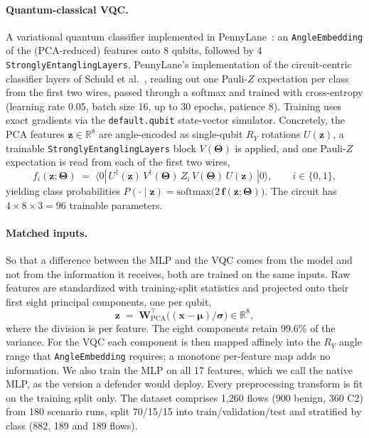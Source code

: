 \documentclass[preprint,12pt]{elsarticle}
\begin{document}
\paragraph{Quantum-classical VQC.} A variational quantum classifier implemented in
PennyLane~\cite{pennylane2018}: an \texttt{AngleEmbedding} of the (PCA-reduced) features onto 8 qubits,
followed by 4 \texttt{StronglyEntanglingLayers}, PennyLane's implementation of the circuit-centric
classifier layers of Schuld et al.~\cite{schuld2020}, reading out one Pauli-$Z$ expectation per class from
the first two wires, passed through a softmax and trained with cross-entropy (learning rate 0.05, batch
size 16, up to 30 epochs, patience 8). Training uses exact gradients via the \texttt{default.qubit}
state-vector simulator.
Concretely, the PCA features $\mathbf{z}\in\mathbb{R}^{8}$ are angle-encoded as single-qubit $R_Y$
rotations $U(\mathbf{z})$, a trainable \texttt{StronglyEntanglingLayers} block $V(\boldsymbol{\Theta})$
is applied, and one Pauli-$Z$ expectation is read from each of the first two wires,
\begin{equation}
f_i(\mathbf{z};\boldsymbol{\Theta}) \;=\;
\langle 0|\,U^{\dagger}(\mathbf{z})\,V^{\dagger}(\boldsymbol{\Theta})\,Z_i\,V(\boldsymbol{\Theta})\,U(\mathbf{z})\,|0\rangle,
\qquad i\in\{0,1\},
\label{eq:vqc}
\end{equation}
yielding class probabilities $P(\cdot\mid\mathbf{z})=\mathrm{softmax}\big(2\,\mathbf{f}(\mathbf{z};\boldsymbol{\Theta})\big)$.
The circuit has $4\times 8\times 3 = 96$ trainable parameters.

\paragraph{Matched inputs.} So that a difference between the MLP and the VQC comes from the model and
not from the information it receives, both are trained on the same inputs. Raw features are
standardized with training-split statistics and projected onto their first eight principal
components, one per qubit,
\begin{equation}
\mathbf{z} \;=\; \mathbf{W}_{\mathrm{PCA}}^{\top}\big((\mathbf{x}-\boldsymbol{\mu})/\boldsymbol{\sigma}\big)\in\mathbb{R}^{8},
\label{eq:pca}
\end{equation}
where the division is per feature. The eight components retain 99.6\% of the variance. For the VQC each
component is then mapped affinely into the $R_Y$ angle range that \texttt{AngleEmbedding} requires; a
monotone per-feature map adds no information. We also train the MLP on all 17 features, which we call
the native MLP, as the version a defender would deploy. Every preprocessing transform is fit on the
training split only. The dataset comprises 1{,}260 flows (900 benign, 360 C2) from 180 scenario runs,
split 70/15/15 into train/validation/test and stratified by class (882, 189 and 189 flows).
\end{document}
